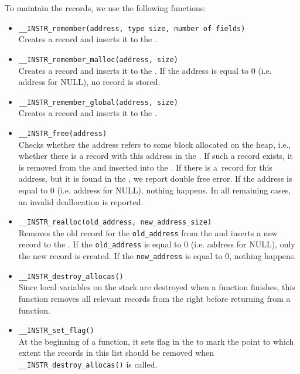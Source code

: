 To maintain the records, we use the following functions:
\begin{itemize}
  \item \texttt{\_\_INSTR\_remember(address, type size, number of fields)}
  \\Creates a record and inserts it to the \stacklist.
  \item \texttt{\_\_INSTR\_remember\_malloc(address, size)}
  \\Creates a record and inserts it to the \heaplist. If the address is equal
  to 0 (i.e.  address for NULL), no record is stored.
  \item \texttt{\_\_INSTR\_remember\_global(address, size)}
  \\Creates a record and inserts it to the \globalslist.
  \item \texttt{\_\_INSTR\_free(address)}
  \\Checks whether the address refers to some block allocated on the heap,
  i.e., whether there is a record with this address in the \heaplist. If such a
  record exists, it is removed from the \heaplist and inserted into the
  \dealloclist. If there is a~record for this address, but it is found in the
  \dealloclist, we report double free error. If the address is equal to 0 (i.e.
  address for NULL), nothing happens. In all remaining cases, an invalid
  deallocation is reported.
  \item \texttt{\_\_INSTR\_realloc(old\_address, new\_address\_size)} \\Removes
  the old record for the \texttt{old\_address} from the \heaplist and inserts a
  new record to the \heaplist. If the \texttt{old\_address} is equal to 0
  (i.e. address for NULL), only the new record is created. If the
  \texttt{new\_address} is equal to 0, nothing happens.
  \item \texttt{\_\_INSTR\_destroy\_allocas()}
  \\ Since local variables on the stack are destroyed when a function
  finishes, this function removes all relevant records from the \stacklist right
  before returning from a function.
  \item \texttt{\_\_INSTR\_set\_flag()}
  \\ At the beginning of a function, it sets flag in the \stacklist to mark the
  point to which extent the records in this list should be removed when
  \texttt{\_\_INSTR\_destroy\_allocas()} is called.
\end{itemize}

